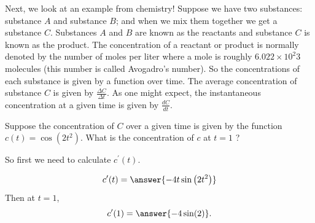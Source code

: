 \documentclass{ximera}
\begin{document}
\begin{example}
\label{example:6-5}
Next, we look at an example from chemistry! Suppose we have two substances: substance $A$ and substance $B$; and when we mix them together we get a substance $C$. Substances $A$ and $B$ are known as the reactants and substance $C$ is known as the product. The concentration of a reactant or product is normally denoted by the number of moles per liter where a mole is roughly $6.022 \times 10^{2} 3$ molecules (this number is called Avogadro's number). So the concentrations of each substance is given by a function over time. The average concentration of substance $C$ is given by $\frac{\Delta C}{\Delta t}$. As one might expect, the instantaneous concentration at a given time is given by $\frac{d C}{d t}$.

Suppose the concentration of $C$ over a given time is given by the function $c(t)=\cos \left(2 t^{2}\right)$. What is the concentration of $c$ at $t=1$ ?

So first we need to calculate $c^{\prime}(t)$.

\[
c^{\prime}(t)=\answer{-4t\sin\left(2t^{2}\right)}
\]
Then at $t=1$,
\[
c^{\prime}(1)=\answer{-4\sin(2)}.
\]
\end{example}
\end{document}
